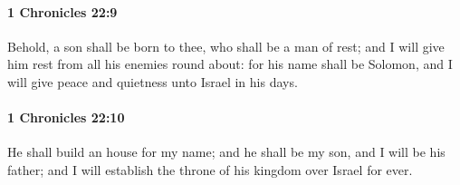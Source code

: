 		\paragraph{1 Chronicles 22:9} %
			\label{1CHRONICLES-22-9}

			Behold, a son shall be born to thee, who shall be a man of rest; and I will give him rest from all his enemies round about: for his name shall be Solomon, and I will give peace and quietness unto Israel in his days.


		\paragraph{1 Chronicles 22:10} %
			\label{1CHRONICLES-22-10}

			He shall build an house for my name; and he shall be my son, and I will be his father; and I will establish the throne of his kingdom over Israel for ever.


